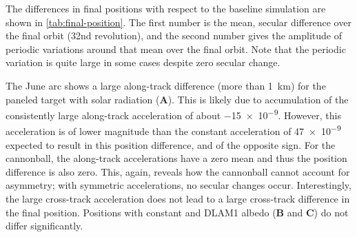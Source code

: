 \begin{table}[tb]
    \caption{Difference of final position in \unit{\m} with respect to the no-\gls{RP} baseline, given as mean over the final orbit plus/minus periodic variations around that mean. The largest changes are in the along-track position. $\mathbf{A}$: solar only; $\mathbf{B}$: lunar only (thermal + constant albedo); $\mathbf{C}$: lunar only (thermal + \gls{DLAM1} albedo); $\mathbf{D}$: solar + lunar (thermal + \gls{DLAM1} albedo).}
    \label{tab:final-position}
    \begin{subtable}[c]{\textwidth}
        
     \end{subtable}

     \medskip

     \begin{subtable}[c]{\textwidth}
        
     \end{subtable}
\end{table}

The differences in final positions with respect to the baseline simulation are shown in \cref{tab:final-position}. The first number is the mean, secular difference over the final orbit (32nd revolution), and the second number gives the amplitude of periodic variations around that mean over the final orbit. Note that the periodic variation is quite large in some cases despite zero secular change.

The June arc shows a large along-track difference (more than \qty{1}{\km}) for the paneled target with solar radiation ($\mathbf{A}$). This is likely due to accumulation of the consistently large along-track acceleration of about \qty{-15e-9}{\acc}. However, this acceleration is of lower magnitude than the constant acceleration of \qty{+47e-9}{\acc} expected to result in this position difference, and of the opposite sign. For the cannonball, the along-track accelerations have a zero mean and thus the position difference is also zero. This, again, reveals how the cannonball cannot account for asymmetry; with symmetric accelerations, no secular changes occur. Interestingly, the large cross-track acceleration does not lead to a large cross-track difference in the final position. Positions with constant and \gls{DLAM1} albedo ($\mathbf{B}$ and $\mathbf{C}$) do not differ significantly.

